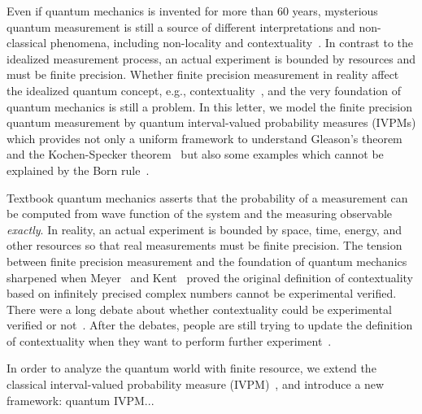 \documentclass[english,reprint, aps, prl,superscriptaddress, showpacs,
showkeys, longbibliography, amsmath, amssymb]{revtex4-1}
\theoremstyle{plain}
\theoremstyle{definition}
\begin{document}
\maketitle

Even if quantum mechanics is invented for more than 60 years, mysterious
quantum measurement is still a source of different interpretations
and non-classical phenomena, including non-locality and contextuality~\cite{BellBook1987,Redhead1987-REDINA,peres1995quantum,Jaeger2007}.
In contrast to the idealized measurement process, an actual experiment
is bounded by resources and must be finite precision. Whether finite
precision measurement in reality affect the idealized quantum concept,
e.g., contextuality~\cite{PhysRevLett.83.3751,Mermin1999,BarrettKent2004},
and the very foundation of quantum mechanics is still a problem. In
this letter, we model the finite precision quantum measurement by
quantum interval-valued probability measures (IVPMs) which provides
not only a uniform framework to understand Gleason's theorem~\cite{gleason1957,Redhead1987-REDINA,peres1995quantum}
and the Kochen-Specker theorem~\cite{kochenspecker1967,peres1995quantum,Redhead1987-REDINA}
but also some examples which cannot be explained by the Born rule~\cite{Born1983,peres1995quantum,544199,Jaeger2007}.

Textbook quantum mechanics asserts that the probability of a measurement
can be computed from wave function of the system and the measuring
observable \emph{exactly}. In reality, an actual experiment is bounded
by space, time, energy, and other resources so that real measurements
must be finite precision. The tension between finite precision measurement
and the foundation of quantum mechanics sharpened when Meyer~\cite{PhysRevLett.83.3751}
and Kent~\cite{Kent1999} proved the original definition of contextuality
based on infinitely precised complex numbers cannot be experimental
verified. There were a long debate about whether contextuality could
be experimental verified or not~\cite{Mermin1999,Peres2003,BarrettKent2004}.
After the debates, people are still trying to update the definition
of contextuality when they want to perform further experiment~\cite{Spekkens2005,GuehneKleinmannCabelloEtAl2010,MazurekPuseyKunjwalEtAl2016}.

In order to analyze the quantum world with finite resource, we extend
the classical interval-valued probability measure (IVPM)~\cite{JamisonLodwick2004},
and introduce a new framework: quantum IVPM...\newpage{}
\end{document}
